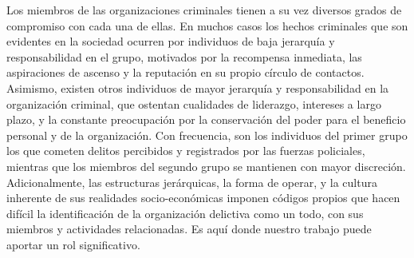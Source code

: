Los miembros de las organizaciones criminales tienen a su vez diversos grados de compromiso con cada una de ellas. En muchos casos los hechos criminales que son evidentes en la sociedad ocurren por individuos de baja jerarquía y responsabilidad en el grupo, motivados por la recompensa inmediata, las aspiraciones de ascenso y la reputación en su propio círculo de contactos. Asimismo, existen otros individuos de mayor jerarquía y responsabilidad en la organización criminal, que ostentan cualidades de liderazgo, intereses a largo plazo, y la constante preocupación por la conservación del poder para el beneficio personal y de la organización. Con frecuencia, son los individuos del primer grupo los que cometen delitos percibidos y registrados por las fuerzas policiales, mientras que los miembros del segundo grupo se mantienen con mayor discreción. Adicionalmente, las estructuras jerárquicas, la forma de operar, y la cultura inherente de sus realidades socio-económicas  imponen códigos propios que hacen difícil la identificación de la organización delictiva como un todo, con sus miembros y actividades relacionadas. Es aquí donde nuestro trabajo puede aportar un rol significativo.
